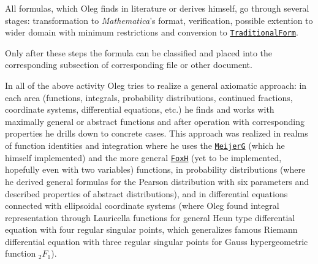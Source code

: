 








All formulas, which Oleg finds in literature or derives himself, go through several stages: transformation to \textit{Mathematica}'s format, verification, possible extention to wider domain with minimum restrictions and conversion to \href{https://reference.wolfram.com/language/ref/TraditionalForm.html}{\tt Traditional\-Form}. 

Only after these steps the formula can be classified and placed into the corresponding subsection of corresponding file or other document.





In all of the above activity Oleg tries to realize a general axiomatic approach: in each area (functions, integrals, probability distributions, continued fractions, coordinate systems, differential equations, etc.) he finds and works with maximally general or abstract functions and after operation with corresponding properties he drills down to concrete cases. This approach was realized in realms of function identities and integration where he uses the \href{http://reference.wolfram.com/language/ref/MeijerG.html}{\texttt{MeijerG}}  (which he himself implemented) and the more general \href{http://mathworld.wolfram.com/FoxH-Function.html}{\tt FoxH} (yet to be implemented, hopefully even with two variables) functions, in probability distributions (where he derived general formulas for the Pearson distribution with six parameters and described properties of abstract distributions), and in differential equations connected with ellipsoidal coordinate systems (where Oleg found integral representation through Lauricella functions for general Heun type differential equation with four regular singular points, which generalizes famous Riemann differential equation with three regular singular points for Gauss hypergeometric function ${}_2F_1$).



